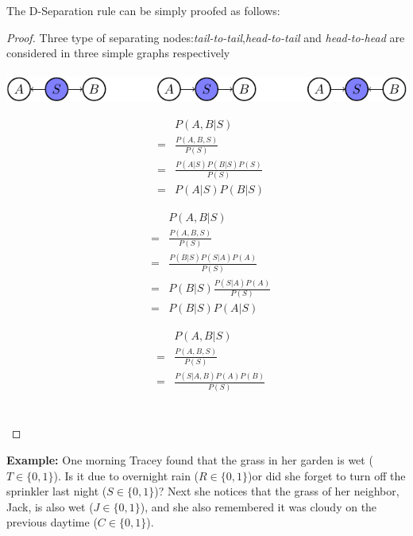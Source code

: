 The D-Separation rule can be simply proofed as follows:
\begin{proof}
	Three type of separating nodes:\emph{tail-to-tail},\emph{head-to-tail} and \emph{head-to-head} are considered in three simple graphs respectively   \\ \\
	\includegraphics[width=\textwidth]{./Figures/D_Sep}\newline
\begin{minipage}[c]{0.32\textwidth}
 \begin{equation*}
  \begin{array}{rcl}
   & & P(A,B|S)\\
   &=& \frac{P(A,B,S)}{P(S)}\\
   &=& \frac{P(A|S)P(B|S)P(S)}{P(S)}\\
   &=& P(A|S)P(B|S)
  \end{array}
 \end{equation*}
\end{minipage}
\begin{minipage}[c]{0.32\textwidth}
 \begin{equation*}
  \begin{array}{rcl}
   & & P(A,B|S)\\
   &=& \frac{P(A,B,S)}{P(S)}\\
   &=& \frac{P(B|S)P(S|A)P(A)}{P(S)}\\
   &=& P(B|S)\frac{P(S|A)P(A)}{P(S)}\\
   &=& P(B|S)P(A|S)
  \end{array}
 \end{equation*}
\end{minipage}
\begin{minipage}[c]{0.32\textwidth}
 \begin{equation*}
  \begin{array}{rcl}
   & & P(A,B|S)\\
   &=& \frac{P(A,B,S)}{P(S)}\\
   &=& \frac{P(S|A,B)P(A)P(B)}{P(S)}\\
  \end{array}
 \end{equation*}
\end{minipage}\\
\end{proof}

\begin{shaded}
   \textbf{Example:} One morning Tracey found that the grass in her garden is wet ($T\in\{0,1\}$). Is it due to overnight rain ($R \in\{0,1\}$)or did
she forget to turn off the sprinkler last night ($S\in\{0,1\}$)? Next she notices that the grass of her neighbor, Jack, is also
wet ($J\in\{0,1\}$), and she also remembered it was cloudy on the previous daytime ($C\in\{0,1\}$).                   
\end{shaded}

